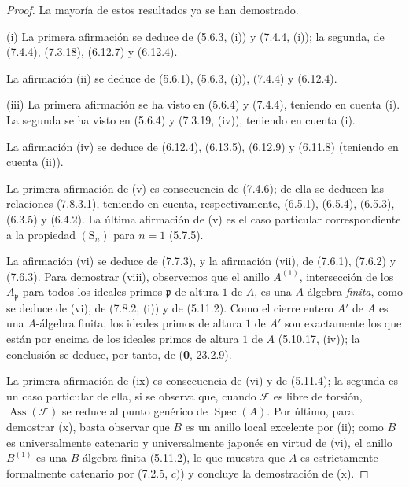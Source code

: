 \begin{proof}
La mayoría de estos resultados ya se han demostrado.

(i) La primera afirmación se deduce de (5.6.3, (i)) y (7.4.4, (i));
la segunda, de (7.4.4), (7.3.18), (6.12.7) y (6.12.4).

La afirmación (ii) se deduce de (5.6.1), (5.6.3, (i)), (7.4.4) y (6.12.4).

(iii) La primera afirmación se ha visto en (5.6.4) y (7.4.4), teniendo en
cuenta (i). La segunda se ha visto en (5.6.4) y (7.3.19, (iv)), teniendo en
cuenta (i).

La afirmación (iv) se deduce de (6.12.4), (6.13.5), (6.12.9) y (6.11.8)
(teniendo en cuenta (ii)).

La primera afirmación de (v) es consecuencia de (7.4.6); de ella se deducen
las relaciones (7.8.3.1), teniendo en cuenta, respectivamente, (6.5.1),
(6.5.4), (6.5.3), (6.3.5) y (6.4.2). La última afirmación de (v) es el
caso particular correspondiente a la propiedad $(\mathrm S_n)$ para $n=1$
(5.7.5).

La afirmación (vi) se deduce de (7.7.3), y la afirmación (vii), de (7.6.1),
(7.6.2) y (7.6.3). Para demostrar (viii), observemos que el anillo
$A^{(1)}$, intersección de los $A_{\mathfrak p}$ para todos los ideales
primos $\mathfrak p$ de altura $1$ de $A$, es una $A$-álgebra \emph{finita}, como
se deduce de (vi), de (7.8.2, (i)) y de (5.11.2). Como el cierre entero
$A'$ de $A$ es una $A$-álgebra finita, los ideales primos de altura $1$ de
$A'$ son exactamente los que están por encima de los ideales primos de
altura $1$ de $A$ (5.10.17, (iv)); la conclusión se deduce, por tanto, de
(\textbf 0, 23.2.9).

La primera afirmación de (ix) es consecuencia de (vi) y de (5.11.4); la
segunda es un caso particular de ella, si se observa que, cuando $\mathcal F$
es libre de torsión, $\operatorname{Ass}(\mathcal F)$ se reduce al punto
genérico de $\operatorname{Spec}(A)$. Por último, para demostrar (x), basta
observar que $B$ es un anillo local excelente por (ii); como $B$ es
universalmente catenario y universalmente japonés en virtud de (vi), el
anillo $B^{(1)}$ es una $B$-álgebra finita (5.11.2), lo que muestra que
$A$ es estrictamente formalmente catenario por (7.2.5, $c)$) y concluye la
demostración de (x).
\end{proof}
